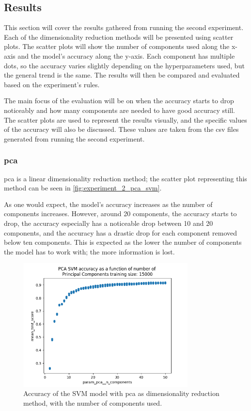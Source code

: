 \subsection{Results}\label{subsec:experiment_2_results}
This section will cover the results gathered from running the second experiment. Each of the dimensionality reduction methods will be presented using scatter plots. The scatter plots will show the number of components used along the x-axis and the model's accuracy along the y-axis. Each component has multiple dots, so the accuracy varies slightly depending on the hyperparameters used, but the general trend is the same. The results will then be compared and evaluated based on the experiment's rules.

The main focus of the evaluation will be on when the accuracy starts to drop noticeably and how many components are needed to have good accuracy still. The scatter plots are used to represent the results visually, and the specific values of the accuracy will also be discussed. These values are taken from the csv files generated from running the second experiment.

\subsubsection{\gls{pca}}\label{subsubsec:experiment_2_pca}
\gls{pca} is a linear dimensionality reduction method; the scatter plot representing this method can be seen in \autoref{fig:experiment_2_pca_svm}.

As one would expect, the model's accuracy increases as the number of components increases. However, around 20 components, the accuracy starts to drop, the accuracy especially has a noticeable drop between 10 and 20 components, and the accuracy has a drastic drop for each component removed below ten components. This is expected as the lower the number of components the model has to work with; the more information is lost.

\begin{figure}[htb!]
    \centering
    \includegraphics[width=0.8\textwidth]{figures/experiment_two/pca_svm_15000.png}
    \caption{Accuracy of the SVM model with \gls{pca} as dimensionality reduction method, with the number of components used.}
    \label{fig:experiment_2_pca_svm}
\end{figure}

